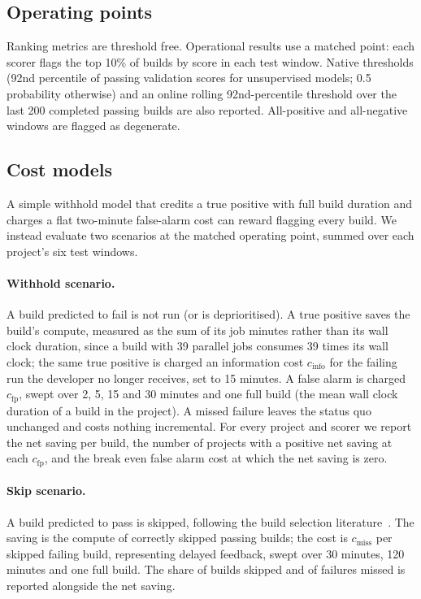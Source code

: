 \documentclass[sigconf,review,anonymous,nonacm]{acmart}
\begin{document}
\subsection{Operating points}
\label{sec:design-operating}

Ranking metrics are threshold free. Operational results use a matched point: each scorer flags the top 10\% of builds by score in each test window. Native thresholds (92nd percentile of passing validation scores for unsupervised models; 0.5 probability otherwise) and an online rolling 92nd-percentile threshold over the last 200 completed passing builds are also reported. All-positive and all-negative windows are flagged as degenerate.

\subsection{Cost models}
\label{sec:design-cost}

A simple withhold model that credits a true positive with full build duration and charges a flat two-minute false-alarm cost can reward flagging every build. We instead evaluate two scenarios at the matched operating point, summed over each project's six test windows.

\paragraph{Withhold scenario.} A build predicted to fail is not run (or is deprioritised). A true positive saves the build's compute, measured as the sum of its job minutes rather than its wall clock duration, since a build with 39 parallel jobs consumes 39 times its wall clock; the same true positive is charged an information cost $c_{\mathrm{info}}$ for the failing run the developer no longer receives, set to 15 minutes. A false alarm is charged $c_{\mathrm{fp}}$, swept over 2, 5, 15 and 30 minutes and one full build (the mean wall clock duration of a build in the project). A missed failure leaves the status quo unchanged and costs nothing incremental. For every project and scorer we report the net saving per build, the number of projects with a positive net saving at each $c_{\mathrm{fp}}$, and the break even false alarm cost at which the net saving is zero.

\paragraph{Skip scenario.} A build predicted to pass is skipped, following the build selection literature~\cite{jin2020, jin2022, abdalkareem2021skip}. The saving is the compute of correctly skipped passing builds; the cost is $c_{\mathrm{miss}}$ per skipped failing build, representing delayed feedback, swept over 30 minutes, 120 minutes and one full build. The share of builds skipped and of failures missed is reported alongside the net saving.
\end{document}
